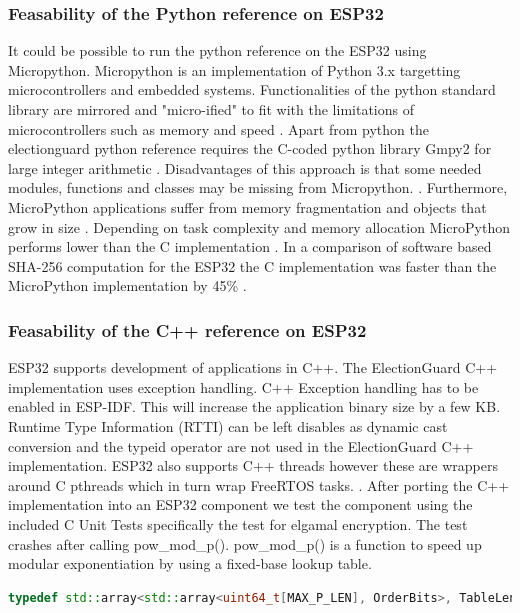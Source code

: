 \subsubsection{Feasability of the Python reference on ESP32}
It could be possible to run the python reference on the ESP32 using Micropython. Micropython is an implementation of Python 3.x targetting microcontrollers and embedded systems. Functionalities of the python standard library are mirrored and "micro-ified" to fit with the limitations of microcontrollers such as memory and speed \cite{micropython} \cite[234]{micropython-performance}. Apart from python the electionguard python reference requires the C-coded python library Gmpy2 for large integer arithmetic \cite{python-reference}. Disadvantages of this approach is that some needed modules, functions and classes may be missing from Micropython. \cite{micropython}. Furthermore, MicroPython applications suffer from memory fragmentation and objects that grow in size \cite[234]{micropython-performance}. Depending on task complexity and memory allocation MicroPython performs lower than the C implementation \cite[237]{micropython-performance}. In a comparison of software based SHA-256 computation for the ESP32 the C implementation was faster than the MicroPython implementation by 45\% \cite[237]{micropython-performance}. 

\subsubsection{Feasability of the C++ reference on ESP32}
ESP32 supports development of applications in C++. The ElectionGuard C++ implementation uses exception handling. C++ Exception handling has to be enabled in ESP-IDF. This will increase the application binary size by a few KB. Runtime Type Information (RTTI) can be left disables as dynamic cast conversion and the typeid operator are not used in the ElectionGuard C++ implementation. ESP32 also supports C++ threads however these are wrappers around C pthreads which in turn wrap FreeRTOS tasks. \cite{esp-prog}. After porting the C++ implementation into an ESP32 component we test the component using the included C Unit Tests specifically the test for elgamal encryption. The test crashes after calling pow\_mod\_p(). pow\_mod\_p() is a function to speed up modular exponentiation by using a fixed-base lookup table. 

\begin{lstlisting}[language=C++, caption={FixedBaseTable Definition}]
    typedef std::array<std::array<uint64_t[MAX_P_LEN], OrderBits>, TableLength> FixedBaseTable;
\end{lstlisting}

